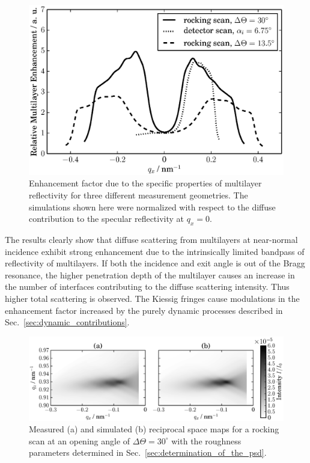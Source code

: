 \documentclass[twocolumn,osajnl,showpacs,superscriptaddress,11pt]{revtex4-1}
\providecommand{\DIFaddbeginFL}{} %
\providecommand{\DIFaddendFL}{} %
\providecommand{\DIFdelbeginFL}{} %
\providecommand{\DIFdelendFL}{} %
\begin{document}
\begin{figure}
	\DIFdelbeginFL %
\DIFdelendFL \DIFaddbeginFL \includegraphics[width=0.5
	\textwidth]{MEF} \DIFaddendFL \caption{Enhancement factor due to the specific properties of multilayer reflectivity for three different measurement geometries. The simulations shown here were normalized with respect to the diffuse contribution to the specular reflectivity at $q_x=0$.} \label{fig:MultilayerInfluence} 
\end{figure}

The results clearly show that diffuse scattering from multilayers at near-normal incidence exhibit strong enhancement due to the intrinsically limited bandpass of reflectivity of multilayers. If both the incidence and exit angle is out of the Bragg resonance, the higher penetration depth of the multilayer causes an increase in the number of interfaces contributing to the diffuse scattering intensity. Thus higher total scattering is observed. The Kiessig fringes cause modulations in the enhancement factor increased by the purely dynamic processes described in Sec.~\ref{sec:dynamic_contributions}.

\begin{figure}
        \DIFdelbeginFL %
\DIFdelendFL \DIFaddbeginFL \includegraphics[width=
        \textwidth]{simulation_vs_measurement} \DIFaddendFL \caption{Measured (a) and simulated (b) reciprocal space maps for a rocking scan at an opening angle of $\Delta\Theta=30^\circ$ with the roughness parameters determined in Sec.~\ref{sec:determination_of_the_psd}.} \label{fig:comparisonWithTheory} 
\end{figure}
\end{document}
